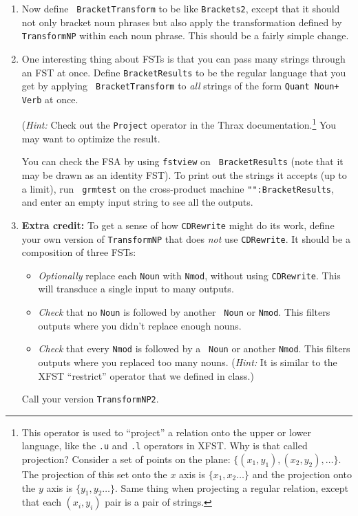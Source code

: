 \documentclass[11pt]{article}
\newcommand{\handinecsym}{\color{blue}{\Large\ding{44}}}  %
\newcounter{handin}
\newcommand{\handinec}{\stepcounter{handin}\hspace{0pt}\marginpar{\hfill\handinecsym$_{\arabic{handin}}$}}
\begin{document}
\begin{enumerate}[resume]
\begin{enumerate}
  \item\label{q:brackettransform} Now define {\tt
      BracketTransform} to be like {\tt Brackets2}, except that it
    should not only bracket noun phrases but also apply the
    transformation defined by {\tt TransformNP} within each noun
    phrase.  This should be a fairly simple change.



  \item One interesting thing about FSTs is that you can pass many
    strings through an FST at once.  Define {\tt BracketResults} to be
    the regular language that you get by applying {\tt
      BracketTransform} to {\em all} strings of the form \texttt{Quant
      Noun+ Verb} at once.

    ({\em Hint:} Check out the {\tt Project} operator in the Thrax
    documentation.\footnote{This operator is used to ``project'' a
      relation onto the upper or lower language, like the {\tt .u} and
      {\tt .l} operators in XFST.  Why is that called projection?
      Consider a set of points on the plane: $\{(x_1,y_1), (x_2,y_2),
      \ldots\}$.  The projection of this set onto the $x$ axis is
      $\{x_1,x_2\ldots\}$ and the projection onto the $y$ axis is
      $\{y_1,y_2\ldots\}$.  Same thing when projecting a regular
      relation, except that each $(x_i,y_i)$ pair is a pair of strings.}
  You may want to optimize the result.

    You can check the FSA by using {\tt fstview} on {\tt
      BracketResults} (note that it may be drawn as an identity FST).
    To print out the strings it accepts (up to a limit), run {\tt
      grmtest} on the cross-product machine \verb/"":BracketResults/,
    and enter an empty input string to see all the outputs.

  \item {\bf Extra credit:} To get a sense of how {\tt CDRewrite}
    might do its work, define your own version of {\tt TransformNP}
    that does {\em not} use {\tt CDRewrite}.  It should be a
    composition of three FSTs:
    \begin{itemize}
    \item {\em Optionally} replace each {\tt Noun} with {\tt Nmod},
      without using {\tt CDRewrite}.
      This will transduce a single input to many outputs.
    \item {\em Check} that no {\tt Noun} is followed by another {\tt
        Noun} or {\tt Nmod}.
      This filters outputs where you didn't replace enough nouns.
    \item {\em Check} that every {\tt Nmod} is followed by a {\tt
        Noun} or another {\tt Nmod}.  This filters outputs where you
      replaced too many nouns.  ({\em Hint:} It is similar to the XFST
      ``restrict'' operator that we defined in class.)
    \end{itemize}
    \handinec Call your version {\tt TransformNP2}.



\end{enumerate}
\end{enumerate}
\end{document}
